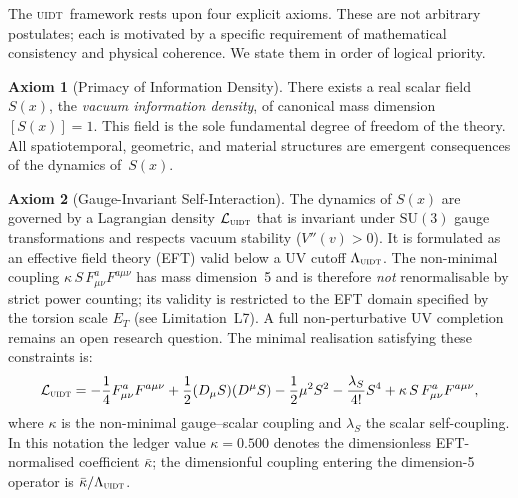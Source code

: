 \documentclass[12pt,a4paper,twoside]{article}
\theoremstyle{plain}
\theoremstyle{definition}
\newtheorem{axiom}{Axiom}
\theoremstyle{remark}
\newcommand{\UIDT}{\textsc{uidt}}
\newcommand{\Sx}{S(x)}
\newcommand{\kappaVal}{0.500}                      %
\begin{document}
The \UIDT\ framework rests upon four explicit axioms. These are not arbitrary
postulates; each is motivated by a specific requirement of mathematical
consistency and physical coherence. We state them in order of logical priority.

\begin{axiom}[Primacy of Information Density]
\label{ax:primacy}
There exists a real scalar field $\Sx$, the \emph{vacuum information density},
of canonical mass dimension $[\Sx] = 1$. This field is the sole fundamental
degree of freedom of the theory. All spatiotemporal, geometric, and material
structures are emergent consequences of the dynamics of~$\Sx$.
\end{axiom}

\begin{axiom}[Gauge-Invariant Self-Interaction]
\label{ax:gauge}
The dynamics of $\Sx$ are governed by a Lagrangian density $\mathcal{L}_{\UIDT}$
that is invariant under $\mathrm{SU}(3)$ gauge transformations and respects vacuum
stability ($V''(v) > 0$). It is formulated as an effective field theory (EFT)
valid below a UV cutoff $\Lambda_{\UIDT}$. The non-minimal coupling
$\kappa\, S\, F_{\mu\nu}^a F^{a\mu\nu}$ has mass dimension~5 and is therefore
\emph{not} renormalisable by strict power counting; its validity is restricted
to the EFT domain specified by the torsion scale $E_T$
(see Limitation~L7). A full non-perturbative UV completion remains an open
research question.
The minimal realisation satisfying these constraints is:
\begin{equation}
  \mathcal{L}_{\UIDT} = -\frac{1}{4}F_{\mu\nu}^a F^{a\mu\nu}
  + \frac{1}{2}(D_\mu S)(D^\mu S)
  - \frac{1}{2}\mu^2 S^2 - \frac{\lambda_S}{4!}S^4
  + \kappa\, S\, F_{\mu\nu}^a F^{a\mu\nu},
  \label{eq:lagrangian}
\end{equation}
where $\kappa$ is the non-minimal gauge--scalar coupling and $\lambda_S$ the
scalar self-coupling. In this notation the ledger value $\kappa=\kappaVal$
denotes the dimensionless EFT-normalised coefficient $\bar{\kappa}$; the
dimensionful coupling entering the dimension-5 operator is
$\bar{\kappa}/\Lambda_{\UIDT}$.
\end{axiom}
\end{document}
